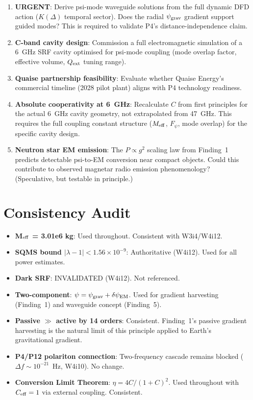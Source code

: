 \documentclass[11pt]{article}
\newcommand{\ee}[1]{\times 10^{#1}}
\newcommand{\psigrav}{\psi_{\rm grav}}
\newcommand{\dpsiEM}{\delta\psi_{\rm EM}}
\newcommand{\Meff}{M_{\rm eff}}
\newcommand{\lambdaone}{|\lambda{-}1|}
\newcommand{\Fpsi}{F_\psi}
\begin{document}
\begin{enumerate}
\item \textbf{URGENT}: Derive psi-mode waveguide solutions from the full
  dynamic DFD action ($K(\Delta)$ temporal sector). Does the radial
  $\psigrav$ gradient support guided modes? This is required to validate
  P4's distance-independence claim.

\item \textbf{C-band cavity design}: Commission a full electromagnetic
  simulation of a 6~GHz SRF cavity optimised for psi-mode coupling (mode
  overlap factor, effective volume, $Q_{\rm ext}$ tuning range).

\item \textbf{Quaise partnership feasibility}: Evaluate whether Quaise
  Energy's commercial timeline (2028 pilot plant) aligns with P4
  technology readiness.

\item \textbf{Absolute cooperativity at 6~GHz}: Recalculate $C$ from
  first principles for the actual 6~GHz cavity geometry, not extrapolated
  from 47~GHz. This requires the full coupling constant structure
  ($\Meff$, $\Fpsi$, mode overlap) for the specific cavity design.

\item \textbf{Neutron star EM emission}: The $P \propto g^2$ scaling law
  from Finding~1 predicts detectable psi-to-EM conversion near compact
  objects. Could this contribute to observed magnetar radio emission
  phenomenology? (Speculative, but testable in principle.)
\end{enumerate}

\section{Consistency Audit}

\begin{itemize}
\item \textbf{M$_{\rm eff}$ = 3.01e6 kg}: Used throughout. Consistent with
  W3i4/W4i12.
\item \textbf{SQMS bound $\lambdaone < 1.56\ee{-9}$}: Authoritative
  (W4i12). Used for all power estimates.
\item \textbf{Dark SRF}: INVALIDATED (W4i12). Not referenced.
\item \textbf{Two-component}: $\psi = \psigrav + \dpsiEM$. Used for
  gradient harvesting (Finding~1) and waveguide concept (Finding~5).
\item \textbf{Passive $\gg$ active by 14 orders}: Consistent. Finding~1's
  passive gradient harvesting is the natural limit of this principle
  applied to Earth's gravitational gradient.
\item \textbf{P4/P12 polariton connection}: Two-frequency cascade remains
  blocked ($\Delta f \sim 10^{-21}$~Hz, W4i10). No change.
\item \textbf{Conversion Limit Theorem}: $\eta = 4C/(1+C)^2$. Used
  throughout with $C_{\rm eff} = 1$ via external coupling. Consistent.
\end{itemize}
\end{document}
